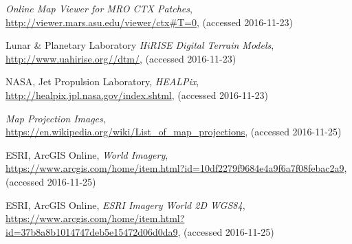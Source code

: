 \begin{thebibliography}{99}
  \emph{Online Map Viewer for MRO CTX Patches},
  \\
  \url{http://viewer.mars.asu.edu/viewer/ctx#T=0},
  (accessed 2016-11-23)
  
  Lunar \& Planetary Laboratory
  \emph{HiRISE Digital Terrain Models},
  \\
  \url{http://www.uahirise.org//dtm/},
  (accessed 2016-11-23)
  
  NASA, Jet Propulsion Laboratory,
  \emph{HEALPix},
  \\
  \url{http://healpix.jpl.nasa.gov/index.shtml},
  (accessed 2016-11-23)
  
  \emph{Map Projection Images},
  \\
  \url{https://en.wikipedia.org/wiki/List_of_map_projections},
  (accessed 2016-11-25)
  
  ESRI, ArcGIS Online,
  \emph{World Imagery},
  \\
  \url{https://www.arcgis.com/home/item.html?id=10df2279f9684e4a9f6a7f08febac2a9},
  (accessed 2016-11-25)
  
  ESRI, ArcGIS Online,
  \emph{ESRI Imagery World 2D WGS84},
  \\
  \url{https://www.arcgis.com/home/item.html?id=37b8a8b1014747deb5e15472d06d0da9},
  (accessed 2016-11-25)
  
\end{thebibliography}
